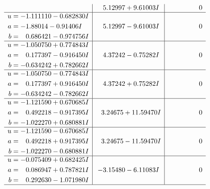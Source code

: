 \documentclass[1p]{elsarticle_modified}
\theoremstyle{definition}
\begin{document}
$$\begin{array}{c|c|c}
 & \phantom{-}5.12997 + 9.61003 I & \phantom{-0.000000 } 0 \\ \hline\begin{aligned}
u &= -1.111110 - 0.682830 I \\
a &= -1.88014 - 0.91406 I \\
b &= \phantom{-}0.686421 - 0.974756 I\end{aligned}
 & \phantom{-}5.12997 - 9.61003 I & \phantom{-0.000000 } 0 \\ \hline\begin{aligned}
u &= -1.050750 + 0.774843 I \\
a &= \phantom{-}0.177397 - 0.916450 I \\
b &= -0.634242 + 0.782662 I\end{aligned}
 & \phantom{-}4.37242 - 0.75282 I & \phantom{-0.000000 } 0 \\ \hline\begin{aligned}
u &= -1.050750 - 0.774843 I \\
a &= \phantom{-}0.177397 + 0.916450 I \\
b &= -0.634242 - 0.782662 I\end{aligned}
 & \phantom{-}4.37242 + 0.75282 I & \phantom{-0.000000 } 0 \\ \hline\begin{aligned}
u &= -1.121590 + 0.670685 I \\
a &= \phantom{-}0.492218 - 0.917395 I \\
b &= -1.022270 + 0.680881 I\end{aligned}
 & \phantom{-}3.24675 + 11.59470 I & \phantom{-0.000000 } 0 \\ \hline\begin{aligned}
u &= -1.121590 - 0.670685 I \\
a &= \phantom{-}0.492218 + 0.917395 I \\
b &= -1.022270 - 0.680881 I\end{aligned}
 & \phantom{-}3.24675 - 11.59470 I & \phantom{-0.000000 } 0 \\ \hline\begin{aligned}
u &= -0.075409 + 0.682425 I \\
a &= \phantom{-}0.086947 + 0.787821 I \\
b &= \phantom{-}0.292630 - 1.071980 I\end{aligned}
 & -3.15480 - 6.11083 I & \phantom{-0.000000 } 0\\
 \hline 
 \end{array}$$\newpage$$\begin{array}{c|c|c}  

\end{array}$$
\end{document}
